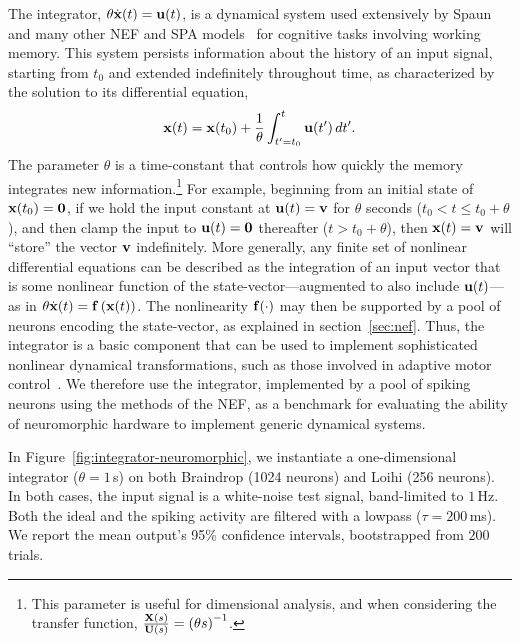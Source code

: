 The integrator, $\theta \dot{\mathbf{x}}(t) = \mathbf{u}(t)$, is a dynamical system used extensively by Spaun~\citep{eliasmith2012} and many other NEF and SPA models~\citep[][to name a few]{singh2004, trujillo2014a, rasmussen2017} for cognitive tasks involving working memory.
This system persists information about the history of an input signal, starting from $t_0$ and extended indefinitely throughout time, as characterized by the solution to its differential equation,
$$\mathbf{x}(t) = \mathbf{x}(t_0) + \frac{1}{\theta} \int_{t'=t_0}^{t} \mathbf{u}(t')\, dt' \text{.}$$
The parameter $\theta$ is a time-constant that controls how quickly the memory integrates new information.\footnote{
This parameter is useful for dimensional analysis, and when considering the transfer function, $\frac{\mathbf{X}(s)}{\mathbf{U}(s)} = \left( \theta s \right)^{-1}$.}
For example, beginning from an initial state of $\mathbf{x}(t_0) = \mathbf{0}$, if we hold the input constant at $\mathbf{u}(t) = \mathbf{v}$ for $\theta$ seconds ($t_0 < t \le t_0 + \theta$), and then clamp the input to $\mathbf{u}(t) = \mathbf{0}$ thereafter ($t > t_0 + \theta$), then $\mathbf{x}(t) = \mathbf{v}$ will ``store'' the vector $\mathbf{v}$ indefinitely.
More generally, any finite set of nonlinear differential equations can be described as the integration of an input vector that is some nonlinear function of the state-vector---augmented to also include $\mathbf{u}(t)$---as in $\theta \dot{\mathbf{x}}(t) = \mathbf{f}\left({\mathbf{x}(t)}\right)$.
The nonlinearity $\mathbf{f}(\cdot)$ may then be supported by a pool of neurons encoding the state-vector, as explained in section~\ref{sec:nef}.
Thus, the integrator is a basic component that can be used to implement sophisticated nonlinear dynamical transformations, such as those involved in adaptive motor control~\citep{dewolf2016}.
We therefore use the integrator, implemented by a pool of spiking neurons using the methods of the NEF, as a benchmark for evaluating the ability of neuromorphic hardware to implement generic dynamical systems.

In Figure~\ref{fig:integrator-neuromorphic}, we instantiate a one-dimensional integrator ($\theta = 1$\,s) on both Braindrop (1024 neurons) and Loihi (256 neurons).
In both cases, the input signal is a white-noise test signal, band-limited to $1$\,Hz.
Both the ideal and the spiking activity are filtered with a lowpass ($\tau = 200$\,ms).
We report the mean output's 95\% confidence intervals, bootstrapped from $200$ trials.

